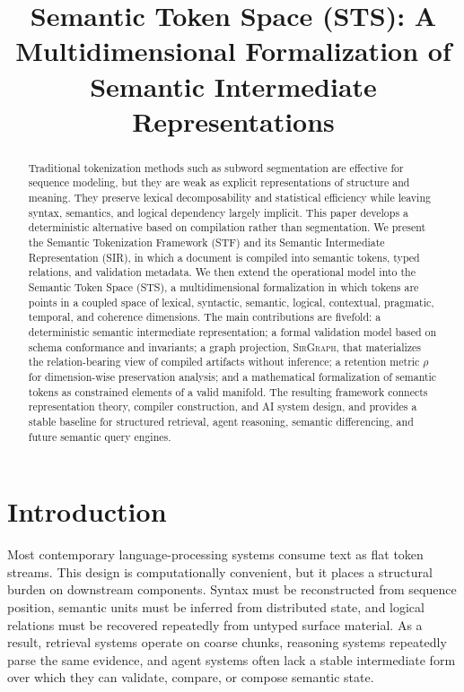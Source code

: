 \documentclass{article}
\title{Semantic Token Space (STS): A Multidimensional Formalization of Semantic Intermediate Representations}
\author{}
\date{}
\newcommand{\STF}{{\normalfont\textsc{STF}}}
\newcommand{\SIR}{{\normalfont\textsc{SIR}}}
\newcommand{\STS}{{\normalfont\textsc{STS}}}
\newcommand{\SirGraphName}{{\normalfont\textsc{SirGraph}}}
\begin{document}
\maketitle

\begin{abstract}
Traditional tokenization methods such as subword segmentation are effective for sequence modeling, but they are weak as explicit representations of structure and meaning. They preserve lexical decomposability and statistical efficiency while leaving syntax, semantics, and logical dependency largely implicit. This paper develops a deterministic alternative based on compilation rather than segmentation. We present the Semantic Tokenization Framework (\STF{}) and its Semantic Intermediate Representation (\SIR{}), in which a document is compiled into semantic tokens, typed relations, and validation metadata. We then extend the operational model into the Semantic Token Space (\STS{}), a multidimensional formalization in which tokens are points in a coupled space of lexical, syntactic, semantic, logical, contextual, pragmatic, temporal, and coherence dimensions. The main contributions are fivefold: a deterministic semantic intermediate representation; a formal validation model based on schema conformance and invariants; a graph projection, \SirGraphName{}, that materializes the relation-bearing view of compiled artifacts without inference; a retention metric \(\rho\) for dimension-wise preservation analysis; and a mathematical formalization of semantic tokens as constrained elements of a valid manifold. The resulting framework connects representation theory, compiler construction, and AI system design, and provides a stable baseline for structured retrieval, agent reasoning, semantic differencing, and future semantic query engines.
\end{abstract}

\section{Introduction}

Most contemporary language-processing systems consume text as flat token streams. This design is computationally convenient, but it places a structural burden on downstream components. Syntax must be reconstructed from sequence position, semantic units must be inferred from distributed state, and logical relations must be recovered repeatedly from untyped surface material. As a result, retrieval systems operate on coarse chunks, reasoning systems repeatedly parse the same evidence, and agent systems often lack a stable intermediate form over which they can validate, compare, or compose semantic state.
\end{document}
